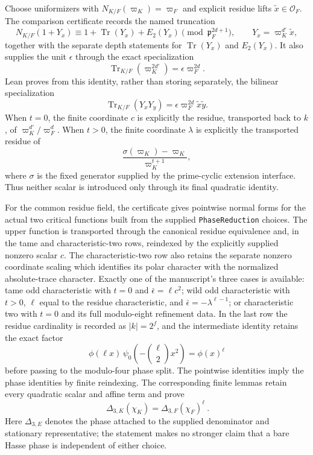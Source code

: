 \begin{theorem}
Choose uniformizers with
$N_{K/F}(\varpi_K)=\varpi_F$ and explicit residue lifts
$\widetilde x\in\mathcal O_F$.  The comparison certificate records the named
truncation
\[
 N_{K/F}(1+Y_x)
 \equiv 1+\operatorname{Tr}(Y_x)+E_2(Y_x)
       \pmod{\mathfrak p_F^{2d+1}},
 \qquad Y_x=\varpi_K^{d'}\widetilde x,
\]
together with the separate depth statements for $\operatorname{Tr}(Y_x)$
and $E_2(Y_x)$.  It also supplies the unit $\epsilon$ through the exact
specialization
\[
 \operatorname{Tr}_{K/F}(\varpi_K^{2d'})
   =\epsilon\varpi_F^{2d}.
\]
Lean proves from this identity, rather than storing separately, the bilinear
specialization
\[
 \operatorname{Tr}_{K/F}(Y_xY_y)
   =\epsilon\varpi_F^{2d}\widetilde x\widetilde y.
\]
When $t=0$, the finite coordinate $c$ is explicitly the residue, transported
back to $k$, of $\varpi_K^{d'}/\varpi_F^d$.  When $t>0$, the finite coordinate
$\lambda$ is explicitly the transported residue of
\[
 \frac{\sigma(\varpi_K)-\varpi_K}{\varpi_K^{t+1}},
\]
where $\sigma$ is the fixed generator supplied by the prime-cyclic extension
interface.  Thus neither scalar is introduced only through its final
quadratic identity.

For the common residue field, the certificate gives pointwise normal forms
for the actual two critical functions built from the supplied
\texttt{PhaseReduction} choices.  The upper function is transported through
the canonical residue equivalence and, in the tame and characteristic-two
rows, reindexed by the explicitly supplied nonzero scalar $c$.  The
characteristic-two row also retains the separate nonzero coordinate scaling
which identifies its polar character with the normalized absolute-trace
character.  Exactly one of the manuscript's three cases is available: tame odd characteristic with
$t=0$ and $\bar\epsilon=\ell c^2$; wild odd characteristic with $t>0$,
$\ell$ equal to the residue characteristic, and
$\bar\epsilon=-\lambda^{\ell-1}$; or characteristic two with $t=0$ and its
full modulo-eight refinement data.  In the last row the residue cardinality is
recorded as $|k|=2^f$, and the intermediate identity retains the exact factor
\[
 \phi(\ell x)\,\psi_0\!\left(-\binom{\ell}{2}x^2\right)=\phi(x)^\ell
\]
before passing to the modulo-four phase split.  The pointwise identities imply
the phase identities by finite reindexing.  The corresponding finite lemmas
retain every quadratic scalar and affine term and prove
\[
 \boxed{\ \Delta_{3,K}(\chi_K)=\Delta_{3,F}(\chi_F)^\ell\ }.
\]
Here $\Delta_{3,E}$ denotes the phase attached to the supplied denominator
and stationary representative; the statement makes no stronger claim that a
bare Hasse phase is independent of either choice.


\end{theorem}
